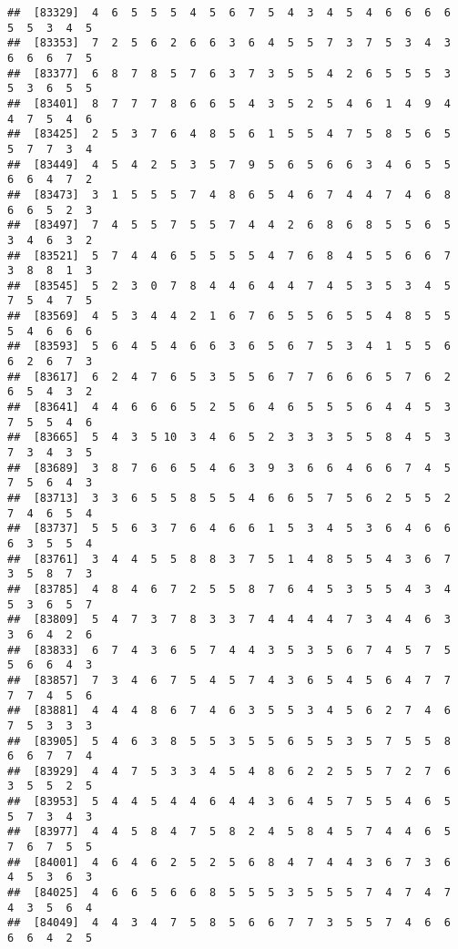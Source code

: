 \documentclass[
]{book}
\begin{document}
\begin{verbatim}
##  [83329]  4  6  5  5  5  4  5  6  7  5  4  3  4  5  4  6  6  6  6  5  5  3  4  5
##  [83353]  7  2  5  6  2  6  6  3  6  4  5  5  7  3  7  5  3  4  3  6  6  6  7  5
##  [83377]  6  8  7  8  5  7  6  3  7  3  5  5  4  2  6  5  5  5  3  5  3  6  5  5
##  [83401]  8  7  7  7  8  6  6  5  4  3  5  2  5  4  6  1  4  9  4  4  7  5  4  6
##  [83425]  2  5  3  7  6  4  8  5  6  1  5  5  4  7  5  8  5  6  5  5  7  7  3  4
##  [83449]  4  5  4  2  5  3  5  7  9  5  6  5  6  6  3  4  6  5  5  6  6  4  7  2
##  [83473]  3  1  5  5  5  7  4  8  6  5  4  6  7  4  4  7  4  6  8  6  6  5  2  3
##  [83497]  7  4  5  5  7  5  5  7  4  4  2  6  8  6  8  5  5  6  5  3  4  6  3  2
##  [83521]  5  7  4  4  6  5  5  5  5  4  7  6  8  4  5  5  6  6  7  3  8  8  1  3
##  [83545]  5  2  3  0  7  8  4  4  6  4  4  7  4  5  3  5  3  4  5  7  5  4  7  5
##  [83569]  4  5  3  4  4  2  1  6  7  6  5  5  6  5  5  4  8  5  5  5  4  6  6  6
##  [83593]  5  6  4  5  4  6  6  3  6  5  6  7  5  3  4  1  5  5  6  6  2  6  7  3
##  [83617]  6  2  4  7  6  5  3  5  5  6  7  7  6  6  6  5  7  6  2  6  5  4  3  2
##  [83641]  4  4  6  6  6  5  2  5  6  4  6  5  5  5  6  4  4  5  3  7  5  5  4  6
##  [83665]  5  4  3  5 10  3  4  6  5  2  3  3  3  5  5  8  4  5  3  7  3  4  3  5
##  [83689]  3  8  7  6  6  5  4  6  3  9  3  6  6  4  6  6  7  4  5  7  5  6  4  3
##  [83713]  3  3  6  5  5  8  5  5  4  6  6  5  7  5  6  2  5  5  2  7  4  6  5  4
##  [83737]  5  5  6  3  7  6  4  6  6  1  5  3  4  5  3  6  4  6  6  6  3  5  5  4
##  [83761]  3  4  4  5  5  8  8  3  7  5  1  4  8  5  5  4  3  6  7  3  5  8  7  3
##  [83785]  4  8  4  6  7  2  5  5  8  7  6  4  5  3  5  5  4  3  4  5  3  6  5  7
##  [83809]  5  4  7  3  7  8  3  3  7  4  4  4  4  7  3  4  4  6  3  3  6  4  2  6
##  [83833]  6  7  4  3  6  5  7  4  4  3  5  3  5  6  7  4  5  7  5  5  6  6  4  3
##  [83857]  7  3  4  6  7  5  4  5  7  4  3  6  5  4  5  6  4  7  7  7  7  4  5  6
##  [83881]  4  4  4  8  6  7  4  6  3  5  5  3  4  5  6  2  7  4  6  7  5  3  3  3
##  [83905]  5  4  6  3  8  5  5  3  5  5  6  5  5  3  5  7  5  5  8  6  6  7  7  4
##  [83929]  4  4  7  5  3  3  4  5  4  8  6  2  2  5  5  7  2  7  6  3  5  5  2  5
##  [83953]  5  4  4  5  4  4  6  4  4  3  6  4  5  7  5  5  4  6  5  5  7  3  4  3
##  [83977]  4  4  5  8  4  7  5  8  2  4  5  8  4  5  7  4  4  6  5  7  6  7  5  5
##  [84001]  4  6  4  6  2  5  2  5  6  8  4  7  4  4  3  6  7  3  6  4  5  3  6  3
##  [84025]  4  6  6  5  6  6  8  5  5  5  3  5  5  5  7  4  7  4  7  4  3  5  6  4
##  [84049]  4  4  3  4  7  5  8  5  6  6  7  7  3  5  5  7  4  6  6  6  6  4  2  5

\end{verbatim}
\end{document}
